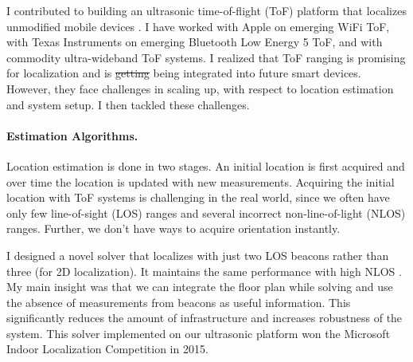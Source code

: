 \documentclass[10pt]{article}
\begin{document}
I contributed to building an ultrasonic time-of-flight (ToF) platform
that localizes unmodified mobile devices \cite{rtas-alps-platform,
  lazik2015alps,lazik2015alpsdemo}.  I have worked with Apple on
emerging WiFi ToF, with Texas Instruments on emerging Bluetooth Low
Energy 5 ToF, and with commodity ultra-wideband ToF systems. I
realized that ToF ranging is promising for localization and is
\st{getting} being integrated into future smart devices.  However,
they face challenges in scaling up, with respect to location
estimation and system setup. I then tackled these challenges.


\paragraph{Estimation Algorithms. } 
Location estimation is done in two stages. An initial location is first acquired and over time the location is updated with new measurements. 
Acquiring the initial location with ToF systems is challenging in the real world, since we often have only few line-of-sight (LOS) ranges and several incorrect non-line-of-light (NLOS) ranges. Further, we don't have ways to acquire orientation instantly. 

I designed a novel solver that localizes with just two LOS beacons rather than three (for 2D localization). It maintains the same performance with high NLOS \cite{rajagopal2018enhancing}.  %
My main insight was that we can integrate the floor plan while solving and use the absence of measurements from beacons as useful information. 
This significantly reduces the amount of infrastructure and increases robustness of the system. 
This solver implemented on our ultrasonic platform won the Microsoft Indoor Localization Competition in 2015. %
\end{document}
